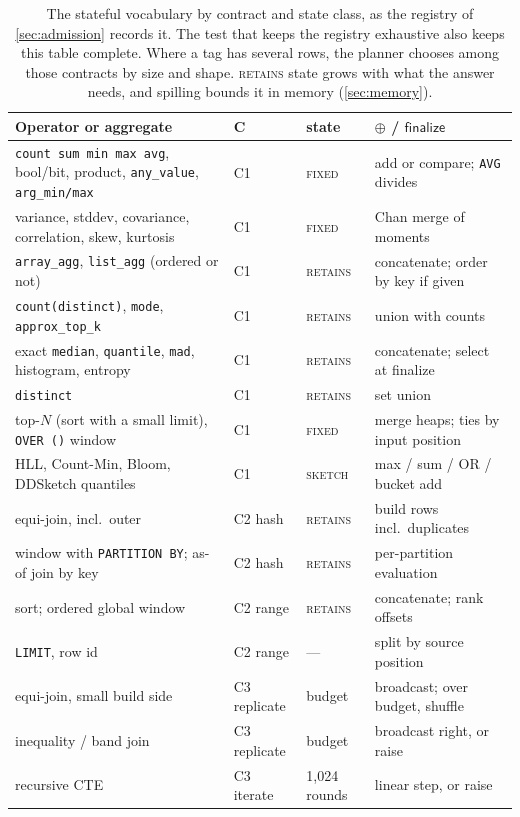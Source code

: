 \documentclass[10pt,twocolumn,letterpaper]{article}   %
\newcommand{\Ca}{\textsc{C1}}
\newcommand{\Cb}{\textsc{C2}}
\newcommand{\Cc}{\textsc{C3}}
\begin{document}
\begin{table}[tbp]
\centering\scriptsize
\setlength{\tabcolsep}{2.2pt}
\begin{tabular}{@{}>{\raggedright\arraybackslash}p{}ll>{\raggedright\arraybackslash}p{}@{}}
\toprule
Operator or aggregate & C & state & $\oplus$ / $\mathsf{finalize}$ \\
\midrule
\texttt{count sum min max avg}, bool/bit, product, \texttt{any\_value}, \texttt{arg\_min/max} & \Ca{} & \textsc{fixed} & add or compare; \texttt{AVG} divides \\
variance, stddev, covariance, correlation, skew, kurtosis & \Ca{} & \textsc{fixed} & Chan merge of moments \\
\texttt{array\_agg}, \texttt{list\_agg} (ordered or not) & \Ca{} & \textsc{retains} & concatenate; order by key if given \\
\texttt{count(distinct)}, \texttt{mode}, \texttt{approx\_top\_k} & \Ca{} & \textsc{retains} & union with counts \\
exact \texttt{median}, \texttt{quantile}, \texttt{mad}, histogram, entropy & \Ca{} & \textsc{retains} & concatenate; select at finalize \\
\texttt{distinct} & \Ca{} & \textsc{retains} & set union \\
top-$N$ (sort with a small limit), \texttt{OVER ()} window & \Ca{} & \textsc{fixed} & merge heaps; ties by input position \\
HLL, Count-Min, Bloom, DDSketch quantiles & \Ca{} & \textsc{sketch} & max / sum / OR / bucket add \\
\midrule
equi-join, incl.\ outer & \Cb{} hash & \textsc{retains} & build rows incl.\ duplicates \\
window with \texttt{PARTITION BY}; as-of join by key & \Cb{} hash & \textsc{retains} & per-partition evaluation \\
sort; ordered global window & \Cb{} range & \textsc{retains} & concatenate; rank offsets \\
\texttt{LIMIT}, row id & \Cb{} range & --- & split by source position \\
\midrule
equi-join, small build side & \Cc{} replicate & budget & broadcast; over budget, shuffle \\
inequality / band join & \Cc{} replicate & budget & broadcast right, or raise \\
recursive CTE & \Cc{} iterate & 1{,}024 rounds & linear step, or raise \\
\bottomrule
\end{tabular}
\caption{The stateful vocabulary by contract and state class, as the registry of
\cref{sec:admission} records it. The test that keeps the registry exhaustive also keeps this
table complete. Where a tag has several rows, the planner chooses among those contracts by
size and shape. \textsc{retains} state grows with what the answer needs, and spilling bounds
it in memory (\cref{sec:memory}).}
\label{tab:vocab}
\end{table}
\end{document}
